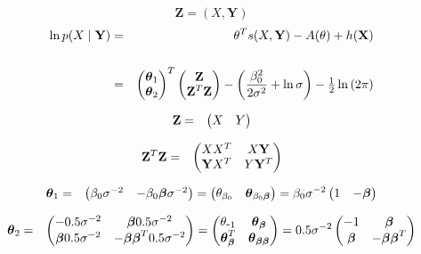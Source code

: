 \documentclass[11pt, oneside]{article}   	%
\newcommand{\bm}{\mathbf}
\newcommand{\bs}{\boldsymbol}
\numberwithin{figure}{section}
\numberwithin{equation}{section}
\numberwithin{table}{section}
\theoremstyle{definition}
\begin{document}
\begin{appendices}
\begin{itemize}
$$\bm Z = ( X, \bm Y)$$
\begin{eqnarray*}
\ln p(X \mid \mathbf{Y}) &=& \theta^T s(X,\mathbf{Y}) - A(\theta) + h(\mathbf{X})\\\\
&=&
\begin{pmatrix}
\thb_1 \\
\thb_2 \\
\end{pmatrix}^T
\begin{pmatrix}
\Z   \\
\Z^T\Z   \\
\end{pmatrix}
- \left( \frac{\beta_0^2}{2\sigma^2} + \ln{\sigma}\right) - \tfrac{1}{2}\ln{(2\pi)}
\end{eqnarray*}




\begin{eqnarray*}
\Z &=& 
\begin{pmatrix}
X & Y
\end{pmatrix}
\end{eqnarray*}

\begin{eqnarray*}
\Z^T\Z &=& 
\begin{pmatrix}
XX^T   & X\Y \\
\Y X^T & Y \Y^T
\end{pmatrix}
\end{eqnarray*}

\begin{eqnarray*}
\thb_1 &=& 
\begin{pmatrix}
\beta_0\sigma^{-2} & -\beta_0\beb\sigma^{-2}
\end{pmatrix}
=
\begin{pmatrix}
\theta_{\beta_0} & \thb_{\beta_0\beb}
\end{pmatrix}
=\beta_0\sigma^{-2}
\begin{pmatrix}
1 & -\beb
\end{pmatrix}
\end{eqnarray*}

\begin{eqnarray*}
\thb_2 &=& 
\begin{pmatrix}
-0.5\sigma^{-2}   &  \beb 0.5\sigma^{-2}\\
\beb 0.5\sigma^{-2}   & -\beb \beb^T 0.5\sigma^{-2}
\end{pmatrix}
= 
\begin{pmatrix}
\theta_{\mbox{-}1}   &  \thb_{\beb} \\
\thb_{\beb}^T   &  \thb_{\beb\beb}
\end{pmatrix}
= 0.5\sigma^{-2}
\begin{pmatrix}
-1   &  \beb \\
\beb    & -\beb \beb^T 
\end{pmatrix}
\end{eqnarray*}


\end{itemize}
\end{appendices}
\end{document}
